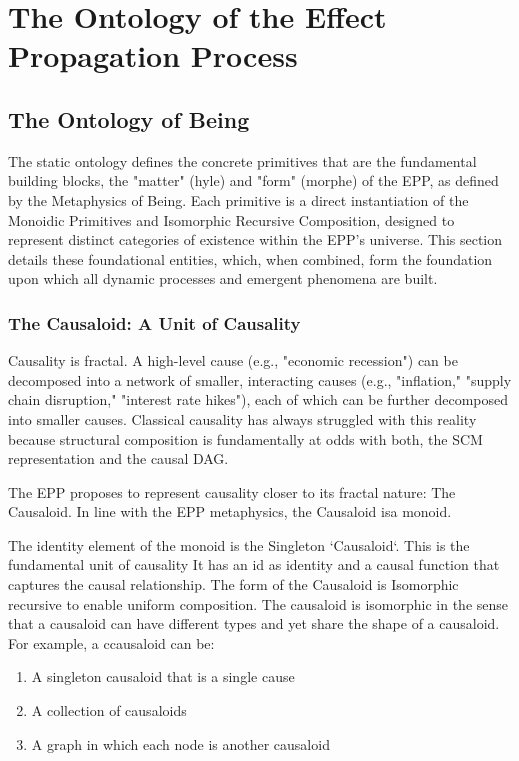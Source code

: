 \section{The Ontology of the Effect Propagation Process}
\label{sec:epp_ontology}

\subsection{The Ontology of Being}
\label{sec:ontology_being}

The static ontology defines the concrete primitives that are the fundamental building blocks, the "matter" (hyle) and "form" (morphe) of the  EPP, as defined by the Metaphysics of Being. Each primitive is a direct instantiation of the Monoidic Primitives and Isomorphic Recursive Composition, designed to  represent distinct categories of existence within the EPP's universe. This section details these foundational entities, which, when combined, form the foundation upon which all dynamic processes and emergent phenomena are built.

\subsubsection{The Causaloid: A Unit of Causality}
\label{sec:ontology_causaloid}

Causality is fractal. A high-level cause (e.g., "economic recession") can be decomposed into a network of smaller, interacting causes (e.g., "inflation," "supply  chain disruption," "interest rate hikes"), each of which can be further decomposed into smaller causes. Classical causality has always struggled with this reality because structural composition is fundamentally at odds with both, the SCM representation and the  causal DAG. 

The EPP proposes to represent causality closer to its fractal nature: The Causaloid. In line with 
the EPP metaphysics, the Causaloid isa  monoid.   

The identity element of the monoid is the Singleton `Causaloid`. This is the fundamental unit of causality It has an id as identity and a causal function that captures the causal relationship. The form of the Causaloid is Isomorphic recursive to enable uniform composition. The causaloid is isomorphic in the sense that a causaloid can have different types and yet share the shape of a causaloid. For example, a ccausaloid can be:

\begin{enumerate}
	\item A singleton causaloid that is a single cause
	\item A collection of causaloids
	\item A graph in which each node is another causaloid 
\end{enumerate}

